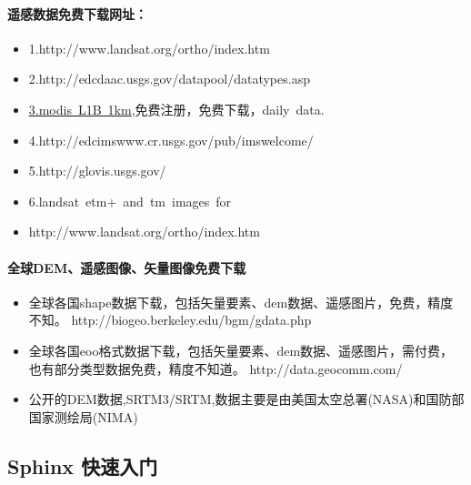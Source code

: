 \documentclass[letterpaper,10pt,english]{sphinxmanual}
\begin{document}
\paragraph{遥感数据免费下载网址：}
\label{opendatasource:}\label{opendatasource:id16}\begin{itemize}
\item {} 
1.http://www.landsat.org/ortho/index.htm

\item {} 
2.http://edcdaac.usgs.gov/datapool/datatypes.asp

\item {} 
\href{http://daac.gsfc.nasa.gov/data/dataset/MODIS/01\_Level\_1/index.html}{3.modis L1B 1km},免费注册，免费下载，daily data.

\item {} 
4.http://edcimswww.cr.usgs.gov/pub/imswelcome/

\item {} 
5.http://glovis.usgs.gov/

\item {} 
6.landsat etm+ and tm images for

\item {} 
http://www.landsat.org/ortho/index.htm

\end{itemize}


\paragraph{全球DEM、遥感图像、矢量图像免费下载}
\label{opendatasource:dem}\begin{itemize}
\item {} 
全球各国shape数据下载，包括矢量要素、dem数据、遥感图片，免费，精度不知。
http://biogeo.berkeley.edu/bgm/gdata.php

\item {} 
全球各国eoo格式数据下载，包括矢量要素、dem数据、遥感图片，需付费，也有部分类型数据免费，精度不知道。
http://data.geocomm.com/

\item {} 
公开的DEM数据,SRTM3/SRTM,数据主要是由美国太空总署(NASA)和国防部国家测绘局(NIMA)

\end{itemize}


\subsection{Sphinx 快速入门}
\label{jupyter/sphinx_quickstart:Sphinx-_u5feb_u901f_u5165_u95e8}\label{jupyter/sphinx_quickstart::doc}
\end{document}
